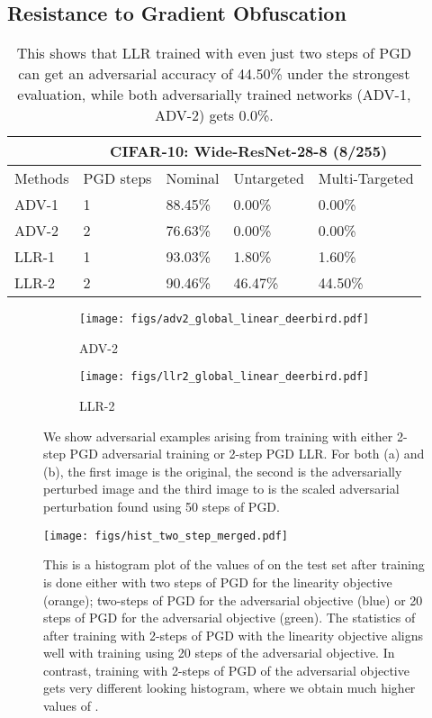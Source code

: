 \documentclass{article}
\theoremstyle{plain}
\theoremstyle{definition}
\theoremstyle{remark}
\begin{document}
\subsection{Resistance to Gradient Obfuscation}
\begin{table}[htb]
\centering
\begin{tabular}{ p{2cm}||p{2.3cm}|p{2.3cm}|p{2.3cm}|p{2.3cm}}
&\multicolumn{4}{c}{{\bf\textcolor{Mahogany}{CIFAR-10: Wide-ResNet-28-8 (8/255)}}} \\
 \hline
 Methods& PGD steps & Nominal &Untargeted  & Multi-Targeted\\
 \hline
 ADV-1 & 1& 88.45\%&  0.00\%&  0.00\%  \\
 ADV-2 & 2  & 76.63\%&  0.00\%&  0.00\%  \\\hline
 LLR-1 &1  & 93.03\% &  1.80\% &  1.60\%\\
 LLR-2 & 2  & 90.46\% &  46.47\% &  44.50\%\\
\end{tabular}
\caption{This shows that LLR trained with even just two steps of PGD can get an adversarial accuracy of 44.50\% under the strongest evaluation, while both adversarially trained networks (ADV-1, ADV-2) gets 0.0\%. }\label{tab:acc_12}
\end{table}
\begin{figure}[htb]
    \centering
    \begin{subfigure}{0.47\textwidth}
    \texttt{[image: figs/adv2\_global\_linear\_deerbird.pdf]}
    \caption{ADV-2}
    \end{subfigure}\hspace{0.5cm}
    \begin{subfigure}{0.47\textwidth}
    \texttt{[image: figs/llr2\_global\_linear\_deerbird.pdf]}
    \caption{LLR-2}
    \end{subfigure}
    \caption{We show adversarial examples arising from training with either 2-step PGD adversarial training or 2-step PGD LLR. For both (a) and (b), the first image is the original, the second is the adversarially perturbed image and the third image to is the scaled adversarial perturbation found using 50 steps of PGD.}
    \label{fig:semantic_image_cifar}
    \texttt{[image: figs/hist\_two\_step\_merged.pdf]}
    \caption{This is a histogram plot of the values of  on the test set after training is done either with two steps of PGD for the linearity objective (orange); two-steps of PGD for the adversarial objective (blue) or 20 steps of PGD for the adversarial objective (green). The statistics of  after training with 2-steps of PGD with the linearity objective aligns well with training using 20 steps of the adversarial objective. In contrast, training with 2-steps of PGD of the adversarial objective gets very different looking histogram, where we obtain much higher values of . }
    \label{fig:average_linearity}
\end{figure}
\end{document}

